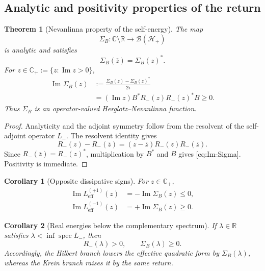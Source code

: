\documentclass[11pt,reqno]{scrartcl}
\newcommand{\CC}{\mathbb C}
\newcommand{\RR}{\mathbb R}
\newcommand{\scrHp}{\mathscr H_{+}}
\DeclareMathOperator{\spec}{spec}
\theoremstyle{plain}
\newtheorem{theorem}{Theorem}[section]
\newtheorem{corollary}[corollary]{Corollary}
\theoremstyle{definition}
\theoremstyle{remark}
\begin{document}
\subsection{Analytic and positivity properties of the return}

\begin{theorem}[Nevanlinna property of the self-energy]
\label{thm:self-energy-Herglotz}
The map
\begin{equation}
  \Sigma_B:\CC\setminus\RR\longrightarrow\mathcal B(\scrHp)
\end{equation}
is analytic and satisfies
\begin{equation}
  \Sigma_B(\overline z)=\Sigma_B(z)^*.
  \label{eq:self-energy-symmetry}
\end{equation}
For \(z\in\CC_+:=\{z:\operatorname{Im}z>0\}\),
\begin{align}
  \operatorname{Im}\Sigma_B(z)
  &:=\frac{\Sigma_B(z)-\Sigma_B(z)^*}{2i}
  \label{eq:Im-Sigma-def}\\
  &=(\operatorname{Im}z)
    B^*R_-(z)R_-(z)^*B
  \ge0.
  \label{eq:Im-Sigma}
\end{align}
Thus \(\Sigma_B\) is an operator-valued Herglotz--Nevanlinna function.
\end{theorem}

\begin{proof}
Analyticity and the adjoint symmetry follow from the resolvent of the
self-adjoint operator \(L_-\).  The resolvent identity gives
\begin{equation}
  R_-(z)-R_-(\overline z)
  =(z-\overline z)R_-(z)R_-(\overline z).
\end{equation}
Since \(R_-(\overline z)=R_-(z)^*\), multiplication by \(B^*\) and \(B\)
gives \eqref{eq:Im-Sigma}.  Positivity is immediate.
\end{proof}

\begin{corollary}[Opposite dissipative signs]
\label{cor:effective-imaginary-sign}
For \(z\in\CC_+\),
\begin{align}
  \operatorname{Im}L_{\mathrm{eff}}^{(+1)}(z)
  &=-\operatorname{Im}\Sigma_B(z)\le0,
  \label{eq:Leff-plus-imag}\\
  \operatorname{Im}L_{\mathrm{eff}}^{(-1)}(z)
  &=+\operatorname{Im}\Sigma_B(z)\ge0.
  \label{eq:Leff-minus-imag}
\end{align}
\end{corollary}

\begin{corollary}[Real energies below the complementary spectrum]
\label{cor:static-self-energy}
If \(\lambda\in\RR\) satisfies
\(\lambda<\inf\spec L_-\), then
\begin{equation}
  R_-(\lambda)>0,
  \qquad
  \Sigma_B(\lambda)\ge0.
  \label{eq:static-positive-self-energy}
\end{equation}
Accordingly, the Hilbert branch lowers the effective quadratic form by
\(\Sigma_B(\lambda)\), whereas the Krein branch raises it by the same return.
\end{corollary}
\end{document}
